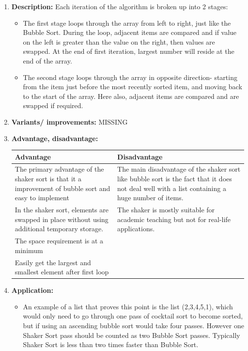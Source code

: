 \documentclass[11pt,a4paper]{article}
\begin{document}
{\begin{enumerate}[label=\textbf{\arabic*})]
\begin{figure}[H]
					\end{figure}
					
				\item \textbf{Description:}
					Each iteration of the algorithm is broken up into 2 stages: 
					\begin{itemize}
						\item The first stage loops through the array from left to right, just like the Bubble Sort. During the loop, adjacent items are compared and if value on the left is greater than the value on the right, then values are swapped. At the end of first iteration, largest number will reside at the end of the array.
						\item The second stage loops through the array in opposite direction- starting from the item just before the most recently sorted item, and moving back to the start of the array. Here also, adjacent items are compared and are swapped if required.
					\end{itemize}
				\item \textbf{Variants/ improvements:}
					MISSING
				\item \textbf{Advantage, disadvantage:}
					\begin{table}[H]
						\centering
						\begin{tabular}{|p{8cm}|p{8cm}|}
							\hline
							\textbf{Advantage} & \textbf{Disadvantage} \\
							\hline
							\hline
							The primary advantage of the shaker sort is that it a improvement of bubble sort and easy to implement & The main disadvantage of the shaker sort like bubble sort is the fact that it does not deal well with a list containing a huge number of items. \\[12pt]
							In the shaker sort, elements are swapped in place without using additional temporary storage. 		   & The shaker is mostly suitable for academic teaching but not for real-life applications.\\[12pt]
							The space requirement is at a minimum & \\[12pt]
							Easily get the largest and smallest element after first loop & \\
							\hline
						\end{tabular}
					\end{table}
				\item \textbf{Application:}	
					\begin{itemize}
						\item An example of a list that proves this point is the list (2,3,4,5,1), which would only need to go through one pass of cocktail sort to become sorted, but if using an ascending bubble sort would take four passes. However one Shaker Sort pass should be counted as two Bubble Sort passes. Typically Shaker Sort is less than two times faster than Bubble Sort.

\end{itemize}
\end{enumerate}}
\end{document}
